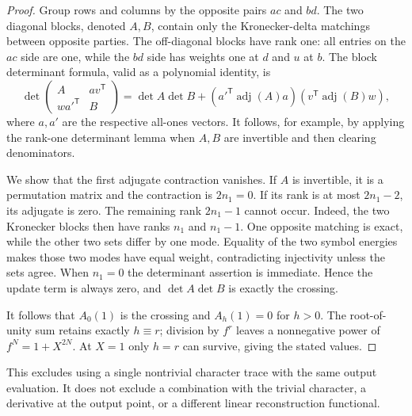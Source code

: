 \begin{proof}
Group rows and columns by the opposite pairs $ac$ and $bd$. The two diagonal blocks, denoted $A,B$, contain only the Kronecker-delta matchings between opposite parties. The off-diagonal blocks have rank one: all entries on the $ac$ side are one, while the $bd$ side has weights one at $d$ and $u$ at $b$. The block determinant formula, valid as a polynomial identity, is
\[
 \det\begin{pmatrix}A&av^{\mathsf T}\\wa'^{\mathsf T}&B\end{pmatrix}
 =\det A\det B+
 (a'^{\mathsf T}\operatorname{adj}(A)a)
 (v^{\mathsf T}\operatorname{adj}(B)w),
\]
where $a,a'$ are the respective all-ones vectors. It follows, for example, by applying the rank-one determinant lemma when $A,B$ are invertible and then clearing denominators.

We show that the first adjugate contraction vanishes. If $A$ is invertible, it is a permutation matrix and the contraction is $2n_1=0$. If its rank is at most $2n_1-2$, its adjugate is zero. The remaining rank $2n_1-1$ cannot occur. Indeed, the two Kronecker blocks then have ranks $n_1$ and $n_1-1$. One opposite matching is exact, while the other two sets differ by one mode. Equality of the two symbol energies makes those two modes have equal weight, contradicting injectivity unless the sets agree. When $n_1=0$ the determinant assertion is immediate. Hence the update term is always zero, and $\det A\det B$ is exactly the crossing.

It follows that $A_0(1)$ is the crossing and $A_h(1)=0$ for $h>0$. The root-of-unity sum retains exactly $h\equiv r$; division by $f^r$ leaves a nonnegative power of $f^N=1+X^{2N}$. At $X=1$ only $h=r$ can survive, giving the stated values.
\end{proof}

This excludes using a single nontrivial character trace with the same output evaluation. It does not exclude a combination with the trivial character, a derivative at the output point, or a different linear reconstruction functional.


